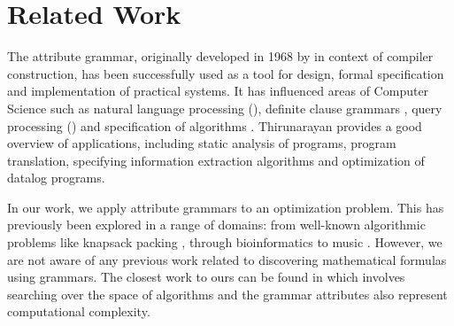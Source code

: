 \vspace{-2mm}
\section{Related Work} \label{relatedwork}
\vspace{-2mm}

The attribute grammar, originally developed in 1968 by \cite{knuth1968semantics} in context of compiler
construction, has been successfully used as a tool for design, formal specification
and implementation of practical systems. It has influenced areas of
Computer Science such as natural language processing (\citealp{hafiz2011modular, starkie2002inferring}), 
definite clause grammars \cite{bratko2001prolog}, query processing (\citealp{koch2007attribute,ramakrishnan1991top}) and specification of algorithms \cite{bellanova1984examples}.
Thirunarayan \cite{thirunarayan2009attribute} provides a good overview of 
applications, including static analysis of programs, program translation, specifying information
extraction algorithms and optimization of datalog programs.

In our work, we apply attribute grammars to an optimization problem. This has previously been explored in a range of domains: from well-known algorithmic problems 
like knapsack packing \cite{o2004solving}, through bioinformatics \cite{waldispuhl2002approximate} to music \cite{desainte1994using}.
However, we are not aware of any previous work related to discovering mathematical formulas using grammars. The closest work to ours can be found in \cite{cheung1999attribute} which involves searching
over the space of algorithms and the grammar attributes also represent computational complexity.




